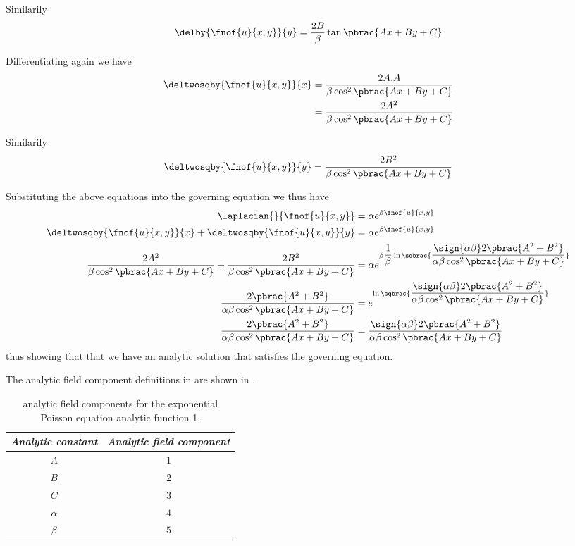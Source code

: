 Similarily
\begin{equation}
  \delby{\fnof{u}{x,y}}{y}=\dfrac{2B}{\beta}\tan\pbrac{Ax+By+C}
\end{equation}

Differentiating again we have
\begin{equation}
  \begin{aligned}
    \deltwosqby{\fnof{u}{x,y}}{x}&=\dfrac{2A.A}{\beta\cos^{2}\pbrac{Ax+By+C}}\\
    &=\dfrac{2A^{2}}{\beta\cos^{2}\pbrac{Ax+By+C}}
  \end{aligned}
\end{equation}

Similarily
\begin{equation}
  \deltwosqby{\fnof{u}{x,y}}{y}=\dfrac{2B^{2}}{\beta\cos^{2}\pbrac{Ax+By+C}}
\end{equation}

Substituting the above equations into the governing equation we thus have
\begin{equation}
  \begin{aligned}
    \laplacian{}{\fnof{u}{x,y}}&=\alpha e^{\beta\fnof{u}{x,y}}\\
    \deltwosqby{\fnof{u}{x,y}}{x}+\deltwosqby{\fnof{u}{x,y}}{y}&=\alpha e^{\beta\fnof{u}{x,y}}\\
    \dfrac{2A^{2}}{\beta\cos^{2}\pbrac{Ax+By+C}}+\dfrac{2B^{2}}{\beta\cos^{2}\pbrac{Ax+By+C}}&=
    \alpha e^{\beta\dfrac{1}{\beta}\ln\sqbrac{\dfrac{\sign{\alpha\beta}2\pbrac{A^{2}+B^{2}}}{\alpha\beta\cos^{2}\pbrac{Ax+By+C}}}}\\
    \dfrac{2\pbrac{A^{2}+B^{2}}}{\alpha\beta\cos^{2}\pbrac{Ax+By+C}}&=
    e^{\ln\sqbrac{\dfrac{\sign{\alpha\beta}2\pbrac{A^{2}+B^{2}}}{\alpha\beta\cos^{2}\pbrac{Ax+By+C}}}} \\
    \dfrac{2\pbrac{A^{2}+B^{2}}}{\alpha\beta\cos^{2}\pbrac{Ax+By+C}}&=
    \dfrac{\sign{\alpha\beta}2\pbrac{A^{2}+B^{2}}}{\alpha\beta\cos^{2}\pbrac{Ax+By+C}} \\
  \end{aligned}
\end{equation}
thus showing that that we have an analytic solution that satisfies the governing equation.

The analytic field component definitions in \OpenCMISS are shown in .

\begin{table}[htb] \centering
  \begin{tabular}{|c|c|} \hline
    \emph{Analytic constant} & \emph{Analytic field component} \\ \hline \hline
    $A$ & $1$ \\ 
    $B$ & $2$ \\
    $C$ & $3$ \\
    $\alpha$ & $4$ \\ 
    $\beta$ & $5$ \\ \hline
  \end{tabular}
  \caption{\OpenCMISS analytic field components for the \twod exponential Poisson equation
    analytic function 1.}
  \label{tab:OpenCMISSAnalyticFieldExponentialPoisonEquationTwoDim1}
\end{table}
